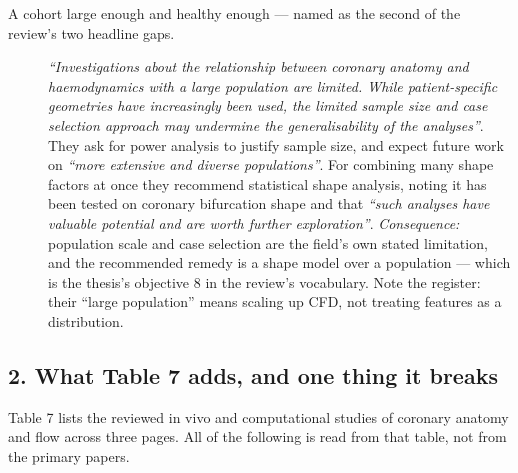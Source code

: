 \begin{description}
\item[A cohort large enough and healthy enough --- named as the second of the review's two headline
gaps.]
\emph{``Investigations about the relationship between coronary anatomy and haemodynamics with a
large population are limited. While patient-specific geometries have increasingly been used, the
limited sample size and case selection approach may undermine the generalisability of the analyses''}.
They ask for power analysis to justify sample size, and expect future work on \emph{``more extensive
and diverse populations''}. For combining many shape factors at once they recommend statistical
shape analysis, noting it has been tested on coronary bifurcation shape
\cite{medranogracia2017bifurcation} and that \emph{``such analyses have valuable potential and are
worth further exploration''}.
\textit{Consequence:} population scale and case selection are the field's own stated limitation, and
the recommended remedy is a shape model over a population --- which is the thesis's objective 8 in
the review's vocabulary. Note the register: their ``large population'' means scaling up CFD, not
treating features as a distribution.

\end{description}

\subsection*{2. What Table 7 adds, and one thing it breaks}

Table 7 lists the reviewed in vivo and computational studies of coronary anatomy and flow across
three pages. All of the following is read from that table, not from the primary papers.

